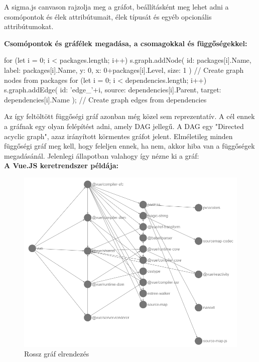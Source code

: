 A sigma.js canvason rajzolja meg a gráfot, beállításként meg lehet adni a csomópontok és élek attribútumait, élek típusát és egyéb opcionális attribútumokat.

\pagebreak

\textbf{Csomópontok és gráfélek megadása, a csomagokkal és függőségekkel:}

\begin{js}
for (let i = 0; i < packages.length; i++) { 
	s.graph.addNode({
		id: packages[i].Name,
		label: packages[i].Name,
		y: 0,
		x: 0+packages[i].Level,
		size: 1
	})        
}// Create graph nodes from packages
for (let i = 0; i < dependencies.length; i++) {
	s.graph.addEdge({
		id: 'edge_'+i,
		source: dependencies[i].Parent,
		target: dependencies[i].Name
	});
} // Create graph edges from dependencies
\end{js}

Az így feltöltött függőségi gráf azonban még közel sem reprezentatív. A cél ennek a gráfnak egy olyan felépítést adni, amely DAG jellegű. A DAG egy "Directed acyclic graph", azaz irányított körmentes gráfot jelent. Elméletileg minden függőségi gráf meg kell, hogy feleljen ennek, ha nem, akkor hiba van a függőségek megadásánál. Jelenlegi állapotban valahogy így nézne ki a gráf:\\

\textbf{A Vue.JS keretrendszer példája:}

\begin{figure}[!h]
	\centering
	\includegraphics[scale=0.4]{images/graph_wrong.png}
	\caption{Rossz gráf elrendezés}
	\label{fig:graph_wrong}
\end{figure}

